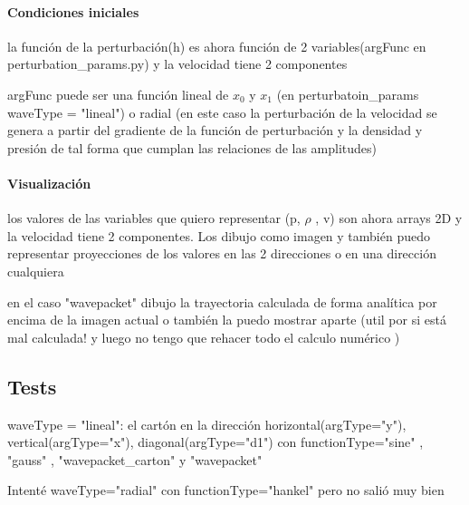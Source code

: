 \documentclass{article}
\begin{document}
\paragraph{Condiciones iniciales}
\begin{description}
\item la función de la perturbación(h) es ahora función de 2 variables(argFunc en perturbation\_params.py)  y la velocidad tiene 2 componentes
\item argFunc puede ser una función lineal de $x_0$ y $x_1$ (en perturbatoin\_params waveType = "lineal") o radial (en este caso la perturbación de la velocidad se genera a partir del gradiente de la función de perturbación y la densidad y presión  de tal forma que cumplan las relaciones de las amplitudes)

\end{description}
\paragraph{Visualización}
\begin{description}
\item los valores de las  variables que quiero representar (p, $\rho$ , v) son ahora arrays 2D y la velocidad tiene 2 componentes. Los dibujo como imagen y también puedo representar proyecciones de los valores en las 2 direcciones o en una dirección cualquiera
\item en el caso "wavepacket" dibujo la trayectoria calculada de forma analítica por encima de la imagen actual o también la puedo mostrar aparte (util por si está mal calculada! y luego no tengo que rehacer todo el calculo numérico )
\end{description}
	
\subsection{Tests}

\begin{description}
\item waveType = "lineal": el cartón en la dirección horizontal(argType="y"), vertical(argType="x"), diagonal(argType="d1") con functionType="sine" , "gauss" , "wavepacket\_carton"  y "wavepacket"
\item Intenté waveType="radial" con functionType="hankel" pero no salió muy bien
\end{description}
\end{document}
